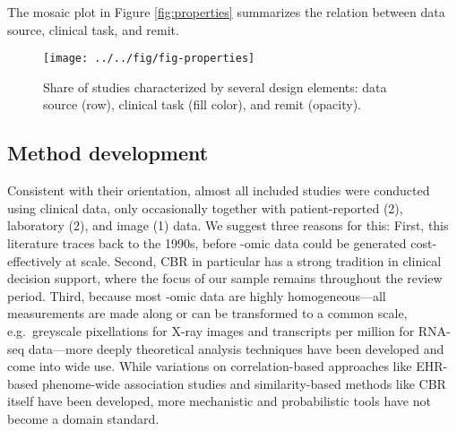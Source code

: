 \documentclass[preprint, 3p,
authoryear]{elsarticle} %
\begin{document}
The mosaic plot in Figure \ref{fig:properties} summarizes the relation
between data source, clinical task, and remit.

\begin{figure}

{\centering \texttt{[image: ../../fig/fig-properties]} 

}

\caption{\label{fig:properties}Share of studies characterized by several design elements: data source (row), clinical task (fill color), and remit (opacity).}\label{fig:fig:properties}
\end{figure}

\hypertarget{method-development}{%
\subsection{Method development}\label{method-development}}

Consistent with their orientation, almost all included studies were
conducted using clinical data, only occasionally together with
patient-reported (2), laboratory (2), and image (1) data. We suggest
three reasons for this: First, this literature traces back to the 1990s,
before -omic data could be generated cost-effectively at scale. Second,
CBR in particular has a strong tradition in clinical decision support,
where the focus of our sample remains throughout the review period.
Third, because most -omic data are highly homogeneous---all measurements
are made along or can be transformed to a common scale, e.g.~greyscale
pixellations for X-ray images and transcripts per million for RNA-seq
data---more deeply theoretical analysis techniques have been developed
and come into wide use. While variations on correlation-based approaches
like EHR-based phenome-wide association studies and similarity-based
methods like CBR itself have been developed, more mechanistic and
probabilistic tools have not become a domain standard.
\end{document}
